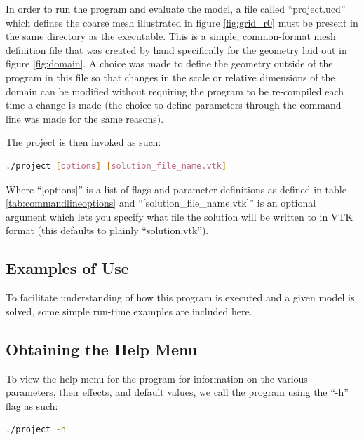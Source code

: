 \documentclass[letterpaper,10pt]{article}
\begin{document}
In order to run the program and evaluate the model, a file called ``project.ucd'' which defines the coarse mesh illustrated in figure \ref{fig:grid_r0} must be present in the same directory as the executable. This is a simple, common-format mesh definition file that was created by hand specifically for the geometry laid out in figure \ref{fig:domain}. A choice was made to define the geometry outside of the program in this file so that changes in the scale or relative dimensions of the domain can be modified without requiring the program to be re-compiled each time a change is made (the choice to define parameters through the command line was made for the same reasons).

The project is then invoked as such:
\vspace{-6mm}
\begin{lstlisting}[numbers=none,frame=none,language=bash]
./project [options] [solution_file_name.vtk]
\end{lstlisting}
\vspace{1mm}

Where ``[options]'' is a list of flags and parameter definitions as defined in table \ref{tab:commandlineoptions} and ``[solution\_file\_name.vtk]'' is an optional argument which lets you specify what file the solution will be written to in VTK format (this defaults to plainly ``solution.vtk'').

\subsection{Examples of Use}
To facilitate understanding of how this program is executed and a given model is solved, some simple run-time examples are included here.

\subsection{Obtaining the Help Menu}
To view the help menu for the program for information on the various parameters, their effects, and default values, we call the program using the ``-h'' flag as such:
\vspace{-6mm}
\begin{lstlisting}[numbers=none,frame=none,language=bash]
./project -h
\end{lstlisting}
\vspace{1mm}
\end{document}
